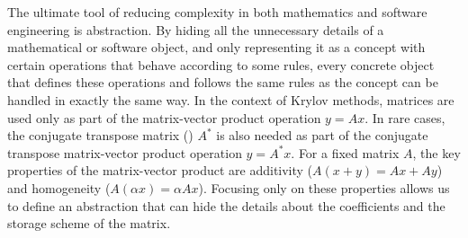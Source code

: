 The ultimate tool of reducing complexity in both mathematics and software
engineering is abstraction. By hiding all the unnecessary details of a
mathematical or software object, and only representing it as a concept with
certain operations that behave according to some rules, every concrete object
that defines these operations and follows the same rules as the concept can be
handled in exactly the same way. In the context of Krylov methods, matrices are
used only as part of the matrix-vector product operation $y = Ax$. In rare
cases, the conjugate transpose matrix () $A^*$ is also
needed as part of the conjugate transpose matrix-vector product operation $y =
A^*x$. For a fixed matrix $A$, the key properties of the matrix-vector product
are additivity ($A(x+y) = Ax + Ay$) and homogeneity ($A(\alpha x) = \alpha Ax$).
Focusing only on these properties allows us to define an abstraction that can
hide the details about the coefficients and the storage scheme of the matrix.

